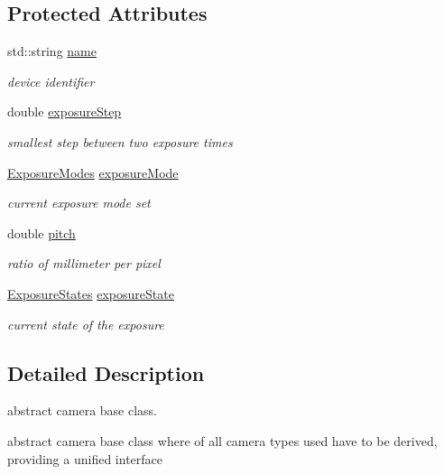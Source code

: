 \subsection*{Protected Attributes}
\begin{DoxyCompactItemize}
\item 
std\+::string \hyperlink{class_generic_camera_a12b86f8137447dd8af1864eb9bb062ee}{name}
\begin{DoxyCompactList}\small\item\em device identifier \end{DoxyCompactList}\item 
double \hyperlink{class_generic_camera_a1d0a61c9839147adaa86e9c456e3ce0c}{exposure\+Step}
\begin{DoxyCompactList}\small\item\em smallest step between two exposure times \end{DoxyCompactList}\item 
\hyperlink{constants_8h_a6e920987695b1da6e2df4e41dc867e18}{Exposure\+Modes} \hyperlink{class_generic_camera_af73c8a9c6218780d50bda3a835d16770}{exposure\+Mode}
\begin{DoxyCompactList}\small\item\em current exposure mode set \end{DoxyCompactList}\item 
double \hyperlink{class_generic_camera_a565f94ee10ad6333ca6e59a2fe8d32bb}{pitch}
\begin{DoxyCompactList}\small\item\em ratio of millimeter per pixel \end{DoxyCompactList}\item 
\hyperlink{constants_8h_ae9749bac8d6973b92725af092d0a76bc}{Exposure\+States} \hyperlink{class_generic_camera_a92600846c7691baabbc78af3b6e1cb67}{exposure\+State}
\begin{DoxyCompactList}\small\item\em current state of the exposure \end{DoxyCompactList}\end{DoxyCompactItemize}


\subsection{Detailed Description}
abstract camera base class. 

abstract camera base class where of all camera types used have to be derived, providing a unified interface 

